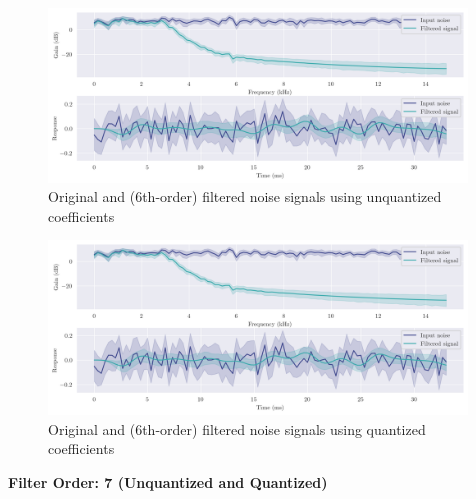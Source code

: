 \begin{figure}[!ht]
    \centering
    \includegraphics[width=0.99\textwidth]{images/q8_6th_stability.png}
    \caption{Original and (6th-order) filtered noise signals using unquantized coefficients}
\end{figure}

\begin{figure}[!ht]
    \centering
    \includegraphics[width=0.99\textwidth]{images/q8_q6th_stability.png}
    \caption{Original and (6th-order) filtered noise signals using quantized coefficients}
\end{figure}

\newpage
{\Large\textbf{Filter Order: 7 (Unquantized and Quantized)}}
\vfill

